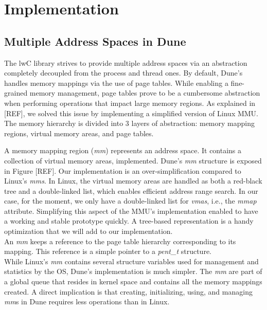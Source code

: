 \chapter{Implementation}
%
%
%


\section{Multiple Address Spaces in Dune}
The lwC library strives to provide multiple address spaces via an abstraction completely decoupled from the process and thread ones.
By default, Dune's handles memory mappings via the use of page tables.
While enabling a fine-grained memory management, page tables prove to be a cumbersome abstraction when performing operations that impact large memory regions.
As explained in [REF], we solved this issue by implementing a simplified version of Linux MMU.
The memory hierarchy is divided into 3 layers of abstraction: memory mapping regions, virtual memory areas, and page tables.

A memory mapping region (\emph{mm}) represents an address space.
It contains a collection of virtual memory areas, implemented.
Dune's \emph{mm} structure is exposed in Figure [REF].
Our implementation is an over-simplification compared to Linux's \emph{mms}.
In Linux, the virtual memory areas are handled as both a red-black tree and a double-linked list, which enables  efficient address range search.
In our case, for the moment, we only have a double-linked list for \emph{vmas}, i.e., the \emph{mmap} attribute.
Simplifying this aspect of the MMU's implementation enabled to have a working and stable prototype quickly.
A tree-based representation is a handy optimization that we will add to our implementation.\\
An \emph{mm} keeps a reference to the page table hierarchy corresponding to its mapping.
This reference is a simple pointer to a \emph{pent\_t} structure.\\
While Linux's \emph{mm} contains several structure variables used for management and statistics by the OS, Dune's implementation is much simpler.
The \emph{mm} are part of a global queue that resides in kernel space and contains all the memory mappings created.
A direct implication is that creating, initializing, using, and managing \emph{mm}s in Dune requires less operations than in Linux.

